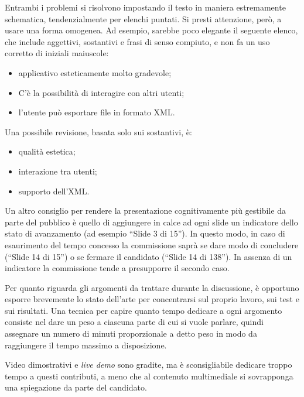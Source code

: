 \documentclass[12pt]{report}
\begin{document}
    Entrambi i problemi si risolvono impostando il testo in maniera estremamente schematica, tendenzialmente per elenchi puntati. Si presti attenzione, però, a usare una forma omogenea.
    Ad esempio, sarebbe poco elegante il seguente elenco, che include aggettivi, sostantivi e frasi di senso compiuto, e non fa un uso corretto di iniziali maiuscole:
    \begin{itemize}
        \item applicativo esteticamente molto gradevole;
        \item C'è la possibilità di interagire con altri utenti;
        \item l'utente può esportare file in formato XML.
    \end{itemize}

    Una possibile revisione, basata solo sui sostantivi, è:
    \begin{itemize}
        \item qualità estetica;
        \item interazione tra utenti;
        \item supporto dell'XML.
    \end{itemize}

    Un altro consiglio per rendere la presentazione cognitivamente più gestibile da parte del pubblico è quello di aggiungere in calce ad ogni slide un indicatore dello stato di avanzamento (ad esempio ``Slide 3 di 15''). In questo modo, in caso di esaurimento del tempo concesso la commissione saprà se dare modo di concludere (``Slide 14 di 15'') o se fermare il candidato (``Slide 14 di 138''). In assenza di un indicatore la commissione tende a presupporre il secondo caso.

    Per quanto riguarda gli argomenti da trattare durante la discussione, è opportuno esporre brevemente lo stato dell'arte per concentrarsi sul proprio lavoro, sui test e sui risultati. Una tecnica per capire quanto tempo dedicare a ogni argomento consiste nel dare un peso a ciascuna parte di cui si vuole parlare, quindi assegnare un numero di minuti proporzionale a detto peso in modo da raggiungere il tempo massimo a disposizione.

    Video dimostrativi e \textit{live demo} sono gradite, ma è sconsigliabile dedicare troppo tempo a questi contributi, a meno che al contenuto multimediale si sovrapponga una spiegazione da parte del candidato.


%
%

    \beforebibliography
    
    

    \closingpage
\end{document}
